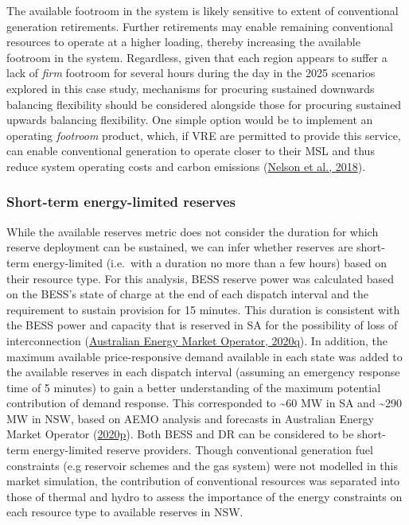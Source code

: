 \documentclass[12pt,a4paper,]{report}
\begin{document}
The available footroom in the system is likely sensitive to extent of
conventional generation retirements. Further retirements may enable
remaining conventional resources to operate at a higher loading, thereby
increasing the available footroom in the system. Regardless, given that
each region appears to suffer a lack of \emph{firm} footroom for several
hours during the day in the 2025 scenarios explored in this case study,
mechanisms for procuring sustained downwards balancing flexibility
should be considered alongside those for procuring sustained upwards
balancing flexibility. One simple option would be to implement an
operating \emph{footroom} product, which, if VRE are permitted to
provide this service, can enable conventional generation to operate
closer to their MSL and thus reduce system operating costs and carbon
emissions
(\protect\hyperlink{ref-nelsonInvestigatingEconomicValue2018}{Nelson et
al., 2018}).

\hypertarget{sec:reserves-stelr}{%
\subsubsection{Short-term energy-limited
reserves}\label{sec:reserves-stelr}}

While the available reserves metric does not consider the duration for
which reserve deployment can be sustained, we can infer whether reserves
are short-term energy-limited (i.e.~with a duration no more than a few
hours) based on their resource type. For this analysis, BESS reserve
power was calculated based on the BESS's state of charge at the end of
each dispatch interval and the requirement to sustain provision for 15
minutes. This duration is consistent with the BESS power and capacity
that is reserved in SA for the possibility of loss of interconnection
(\protect\hyperlink{ref-australianenergymarketoperator2020SystemStrength2020}{Australian
Energy Market Operator, 2020q}). In addition, the maximum available
price-responsive demand available in each state was added to the
available reserves in each dispatch interval (assuming an emergency
response time of 5 minutes) to gain a better understanding of the
maximum potential contribution of demand response. This corresponded to
\textasciitilde60 MW in SA and \textasciitilde290 MW in NSW, based on
AEMO analysis and forecasts in Australian Energy Market Operator
(\protect\hyperlink{ref-australianenergymarketoperator2020InputsAssumptions2020}{2020p}).
Both BESS and DR can be considered to be short-term energy-limited
reserve providers. Though conventional generation fuel constraints (e.g
reservoir schemes and the gas system) were not modelled in this market
simulation, the contribution of conventional resources was separated
into those of thermal and hydro to assess the importance of the energy
constraints on each resource type to available reserves in NSW.
\end{document}
